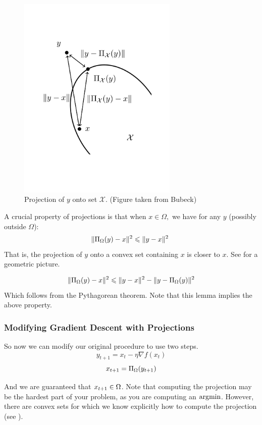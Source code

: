 \begin{figure}
\begin{center}
\includegraphics[width=3in]{figures/lecture2-projection}
\end{center}
\caption{Projection of $y$ onto set $\mathcal{X}$. (Figure taken from Bubeck) }
\end{figure}

A crucial property of projections is that when $x\in\Omega,$ we have for any $y$
(possibly outside $\Omega$):
\[
\| \Pi_{\Omega}(y) - x \|^2 \leqslant \| y - x \|^2\
\]
That is, the projection of $y$ onto a convex set containing $x$ is closer to $x$. See  for a geometric picture.

\begin{lemma}
\[
\| \Pi_{\Omega}(y) - x \|^2 \leqslant \| y - x \|^2 - \| y - \Pi_{\Omega}(y) \|^2
\]
Which follows from the Pythagorean theorem. Note that this lemma implies the above property.
\end{lemma}

\subsubsection{Modifying Gradient Descent with Projections}

So now we can modify our original procedure to use two steps.
\[
y_{t+1} = x_t - \eta \nabla f(x_t)
\]
\[
x_{t+1} = \Pi_{\Omega}(y_{t+1})
\]

And we are guaranteed that $x_{t+1}\in\Omega$. Note that computing the
projection may be the hardest part of your problem, as you are computing an
$\operatorname*{\arg\!\min}$. However, there are convex sets for which we know explicitly how to
compute the projection (see \exampleref{euclidean-ball}).

